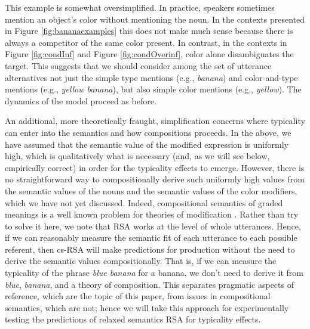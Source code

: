 \documentclass[11pt]{article}
\newcommand{\figref}[1]{Figure \ref{#1}}
\begin{document}
 

This example is somewhat oversimplified. In practice, speakers sometimes mention an object's color without mentioning the noun. In the contexts presented in \figref{fig:bananaexamples} this does not make much sense because there is always a competitor of the same color present. In contrast, in the contexts in \figref{fig:condInf} and \figref{fig:condOverinf}, color alone disambiguates the target. This suggests that we should consider among the set of utterance alternatives not just the simple type mentions (e.g., \emph{banana}) and color-and-type mentions (e.g., \emph{yellow banana}), but also simple color mentions (e.g., \emph{yellow}). The dynamics of the model proceed as before.

An additional, more theoretically fraught, simplification concerns where typicality can enter into the semantics and how compositions proceeds. In the above, we have assumed that the semantic value of the modified expression is uniformly high, which is qualitatively what is necessary (and, as we will see below, empirically correct) in order for the typicality effects to emerge. However, there is no straightforward way to compositionally derive such uniformly high values from the semantic values of the nouns and the semantic values of the color modifiers, which we have not yet discussed. Indeed, compositional semantics of graded meanings is a well known problem for theories of modification \cite{kamp1995}. Rather than try to solve it here, we note that RSA works at the level of whole utterances. Hence, if we can reasonably measure the semantic fit of each utterance to each possible referent, then cs-RSA will make predictions for production without the need to derive the semantic values compositionally. That is, if we can measure the typicality of the phrase \emph{blue banana} for a banana, we don't need to derive it from \emph{blue}, \emph{banana}, and a theory of composition. This separates pragmatic aspects of reference, which are the topic of this paper, from issues in compositional semantics, which are not; hence we will take this approach for experimentally testing the predictions of relaxed semantics RSA for typicality effects.
\end{document}
